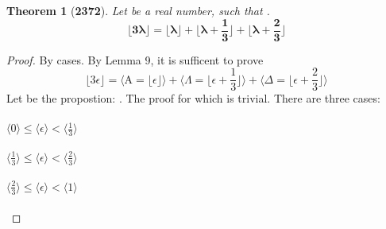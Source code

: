 \documentclass[preview]{standalone}
\newtheorem{theorem}{Theorem}
\begin{document}
\begin{theorem}[\textbf{2372}]
    Let \bm{$\lambda$} be a real number, such that
    \bm{$\big \lfloor \lambda \big \rfloor + \epsilon = \lambda$}.
    \begin{equation*}
        \bm{
            \bigg \lfloor 3 \lambda \bigg \rfloor
                = 
            \bigg \lfloor \lambda \bigg \rfloor
                + 
            \bigg \lfloor \lambda + \frac{1}{3} \bigg \rfloor
                + 
            \bigg \lfloor \lambda + \frac{2}{3} \bigg \rfloor
        }
    \end{equation*}
\end{theorem}

\begin{proof}
    By cases. By Lemma 9, it is sufficent to prove
    \begin{equation*}
        \bigg \lfloor 3 \epsilon \bigg \rfloor
            =
        \Bigg \langle 
            \mathrm{A} 
                = 
            \bigg \lfloor \epsilon \bigg \rfloor 
        \Bigg \rangle
            +
        \Bigg \langle
            \Lambda
                = 
            \bigg \lfloor \epsilon + \frac{1}{3} \bigg \rfloor 
        \Bigg \rangle
            +
        \Bigg \langle
            \Delta
                = 
            \bigg \lfloor \epsilon + \frac{2}{3} \bigg \rfloor
        \Bigg \rangle
    \end{equation*}
    Let  be the propostion: .
    The proof for which is trivial.
    There are three cases:
    \\ \\
    \indent \indent {} \space \space
    $
        \Big \langle 0 \Big \rangle 
            \le 
        \Big \langle \epsilon \Big \rangle
            < 
        \Big \langle \frac{1}{3} \Big \rangle
    $
    \\ \\
    \indent \indent {} \space
    $
        \Big \langle \frac{1}{3} \Big \rangle 
            \le 
        \Big \langle \epsilon \Big \rangle
            < 
        \Big \langle \frac{2}{3} \Big \rangle
    $ 
    \\ \\
    \indent \indent {}
    $ 
        \Big \langle \frac{2}{3} \Big \rangle 
            \le 
        \Big \langle \epsilon \Big \rangle 
            < 
        \Big \langle 1 \Big \rangle
    $
    \\ \\

\end{proof}
\end{document}
